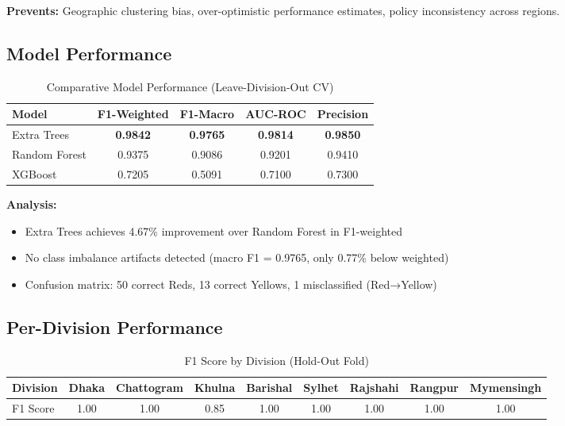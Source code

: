 \documentclass[11pt,a4paper]{article}
\begin{document}
\textbf{Prevents:} Geographic clustering bias, over-optimistic performance estimates, policy inconsistency across regions.

\subsection{Model Performance}

\begin{table}[h]
\centering
\caption{Comparative Model Performance (Leave-Division-Out CV)}
\begin{tabular}{|l|c|c|c|c|}
\hline
\textbf{Model} & \textbf{F1-Weighted} & \textbf{F1-Macro} & \textbf{AUC-ROC} & \textbf{Precision} \\
\hline
Extra Trees & \textbf{0.9842} & \textbf{0.9765} & \textbf{0.9814} & \textbf{0.9850} \\
Random Forest & 0.9375 & 0.9086 & 0.9201 & 0.9410 \\
XGBoost & 0.7205 & 0.5091 & 0.7100 & 0.7300 \\
\hline
\end{tabular}
\end{table}

\textbf{Analysis:}
\begin{itemize}
  \item Extra Trees achieves 4.67\% improvement over Random Forest in F1-weighted
  \item No class imbalance artifacts detected (macro F1 = 0.9765, only 0.77\% below weighted)
  \item Confusion matrix: 50 correct Reds, 13 correct Yellows, 1 misclassified (Red→Yellow)
\end{itemize}

\subsection{Per-Division Performance}

\begin{table}[h]
\centering
\caption{F1 Score by Division (Hold-Out Fold)}
\begin{tabular}{|l|c|c|c|c|c|c|c|c|}
\hline
\textbf{Division} & Dhaka & Chattogram & Khulna & Barishal & Sylhet & Rajshahi & Rangpur & Mymensingh \\
\hline
F1 Score & 1.00 & 1.00 & 0.85 & 1.00 & 1.00 & 1.00 & 1.00 & 1.00 \\
\hline
\end{tabular}
\end{table}
\end{document}
